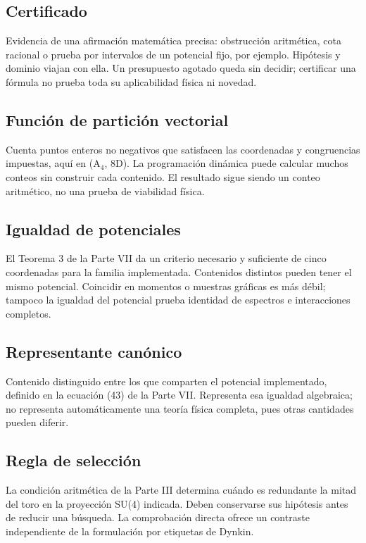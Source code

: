 \documentclass[11pt,a4paper]{article}
\begin{document}
\subsection*{Certificado}
Evidencia de una afirmación matemática precisa: obstrucción aritmética, cota racional o prueba por intervalos de un potencial fijo, por ejemplo. Hipótesis y dominio viajan con ella. Un presupuesto agotado queda sin decidir; certificar una fórmula no prueba toda su aplicabilidad física ni novedad.

\subsection*{Función de partición vectorial}
Cuenta puntos enteros no negativos que satisfacen las coordenadas y congruencias impuestas, aquí en (A\ensuremath{{}_{4}}, 8D). La programación dinámica puede calcular muchos conteos sin construir cada contenido. El resultado sigue siendo un conteo aritmético, no una prueba de viabilidad física.

\subsection*{Igualdad de potenciales}
El Teorema 3 de la Parte VII da un criterio necesario y suficiente de cinco coordenadas para la familia implementada. Contenidos distintos pueden tener el mismo potencial. Coincidir en momentos o muestras gráficas es más débil; tampoco la igualdad del potencial prueba identidad de espectros e interacciones completos.

\subsection*{Representante canónico}
Contenido distinguido entre los que comparten el potencial implementado, definido en la ecuación (43) de la Parte VII. Representa esa igualdad algebraica; no representa automáticamente una teoría física completa, pues otras cantidades pueden diferir.

\subsection*{Regla de selección}
La condición aritmética de la Parte III determina cuándo es redundante la mitad del toro en la proyección SU(4) indicada. Deben conservarse sus hipótesis antes de reducir una búsqueda. La comprobación directa ofrece un contraste independiente de la formulación por etiquetas de Dynkin.
\end{document}
